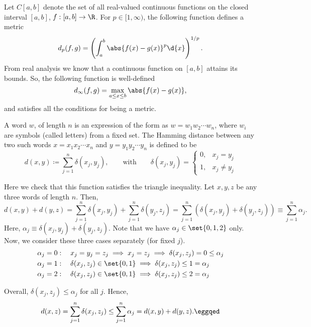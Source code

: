 \begin{negg}
  Let $C[a,b]$ denote the set of all real-valued continuous functions on the closed interval $[a,b]$, $f: [a,b] \to \R$. For $p \in [1,\infty)$, the following function defines a metric
  \begin{equation*}
    d_{p}(f,g) = \left(\int_{a}^{b} \abs{f(x) - g(x)}^{p}\d{x}\right)^{1/p}.
  \end{equation*}
  From real analysis we know that a continuous function on $[a,b]$ attains its bounds. So, the following function is well-defined
  \begin{equation*}
    d_{\infty}(f,g) = \max_{a \leq x \leq b} \abs{f(x) - g(x)},
  \end{equation*}
  and satisfies all the conditions for being a metric.\eggqed
\end{negg}

\begin{negg}
  A word $w$, of length $n$ is an expression of the form as $w=w_1 w_2 \cdots w_n$, where $w_i$ are symbols (called letters) from a fixed set. The Hamming distance between any two such words $x=x_1 x_2 \cdots x_n$ and $y=y_1 y_2 \cdots y_n$ is defined to be
  \begin{equation*}
    d(x,y) \coloneqq \sum_{j=1}^{n} \delta(x_j, y_j),
    \qquad\text{with}\qquad
    \delta(x_j, y_j) = \begin{cases}
    0, & x_j = y_j\\
    1, & x_j \neq y_j
    \end{cases}
  \end{equation*}

  Here we check that this function satisfies the triangle inequality. Let $x,y,z$ be any three words of length $n$. Then,
  \begin{equation*}
    d(x,y) + d(y,z)
    = \sum_{j=1}^{n} \delta(x_j, y_j) + \sum_{j=1}^{n} \delta(y_j, z_j)
    = \sum_{j=1}^{n} \left(\delta(x_j, y_j) + \delta(y_j, z_j)\right)
    \equiv \sum_{j=1}^{n} \alpha_j.
  \end{equation*}
  Here, $\alpha_j \equiv \delta(x_j, y_j) + \delta(y_j, z_j)$. Note that we have $\alpha_j \in \set{0,1,2}$ only. Now, we consider these three cases separately (for fixed $j$).
  \begin{align*}
    \alpha_j &= 0:\quad x_j = y_j = z_j \implies x_j = z_j \implies \delta(x_j, z_j) = 0 \leq \alpha_j\\
    \alpha_j &= 1:\quad \delta(x_j, z_j) \in \set{0,1} \implies \delta(x_j, z_j) \leq 1 = \alpha_j\\
    \alpha_j &= 2:\quad \delta(x_j, z_j) \in \set{0,1} \implies \delta(x_j, z_j) \leq 2 = \alpha_j
  \end{align*}

  Overall, $\delta(x_j, z_j) \leq \alpha_j$ for all $j$. Hence,
  \begin{equation*}
    d(x,z) = \sum_{j=1}^{n} \delta(x_j, z_j) \leq \sum_{j=1}^{n} \alpha_j = d(x,y) + d(y,z).\eggqed
  \end{equation*}
\end{negg}

